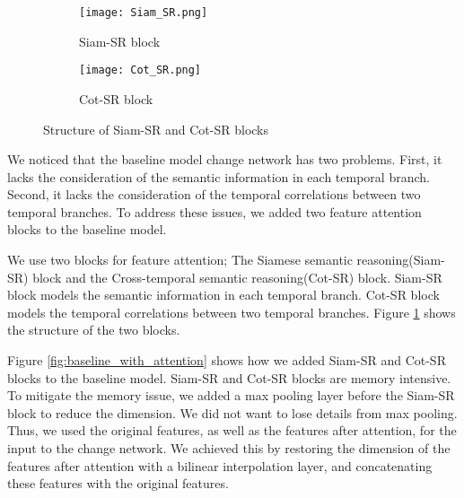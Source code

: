 \documentclass[../main.tex]{subfiles}
\begin{document}
\begin{figure}[h]
    \centering
    \begin{subfigure}[b]{0.21\linewidth}
        \texttt{[image: Siam\_SR.png]}
        \caption{Siam-SR block}
    \end{subfigure}
    \begin{subfigure}[b]{0.4\linewidth}
        \texttt{[image: Cot\_SR.png]}
        \caption{Cot-SR block}
    \end{subfigure}
    \caption{Structure of Siam-SR and Cot-SR blocks\cite{Ding_2022_Bi_SRNet}}
    \label{fig:attention_blocks}
\end{figure}

We noticed that the baseline model change network has two problems. First, it lacks the consideration of the semantic information in each temporal branch. Second, it lacks the consideration of the temporal correlations between two temporal branches. To address these issues, we added two feature attention blocks to the baseline model.

We use two blocks for feature attention; The Siamese semantic reasoning(Siam-SR) block and the Cross-temporal semantic reasoning(Cot-SR) block. Siam-SR block models the semantic information in each temporal branch. Cot-SR block models the temporal correlations between two temporal branches\cite{Ding_2022_Bi_SRNet}. Figure \ref{fig:attention_blocks} shows the structure of the two blocks.

Figure \ref{fig:baseline_with_attention} shows how we added Siam-SR and Cot-SR blocks to the baseline model. Siam-SR and Cot-SR blocks are memory intensive. To mitigate the memory issue, we added a max pooling layer before the Siam-SR block to reduce the dimension. We did not want to lose details from max pooling. Thus, we used the original features, as well as the features after attention, for the input to the change network. We achieved this by restoring the dimension of the features after attention with a bilinear interpolation layer, and concatenating these features with the original features.
\end{document}

